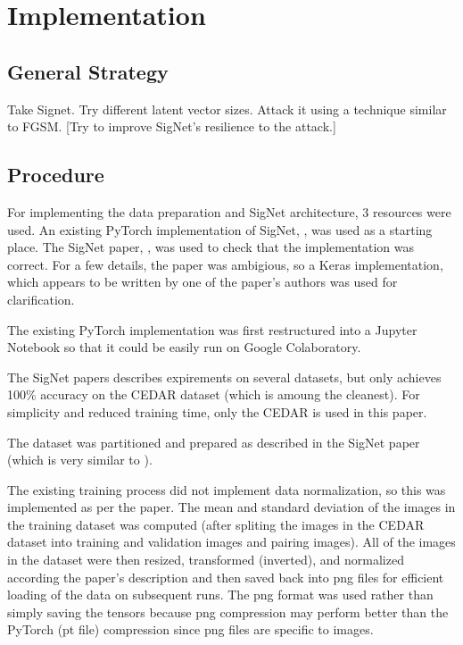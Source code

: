 \section{Implementation}\label{sec:implementation}


\subsection{General Strategy}

Take Signet.
Try different latent vector sizes.
Attack it using a technique similar to FGSM.
[Try to improve SigNet's resilience to the attack.]


\subsection{Procedure}

For implementing the data preparation and SigNet architecture, 3 resources were used.
An existing PyTorch implementation of SigNet, \cite{GitHub_signet_pytorch}, was used as a starting place.
The SigNet paper, \cite{sig_net}, was used to check that the implementation was correct.
For a few details, the paper was ambigious, so a Keras implementation, \cite{GitHub_sounakdey} which appears to be written by one of the paper's authors was used for clarification.

The existing PyTorch implementation was first restructured into a Jupyter Notebook so that it could be easily run on Google Colaboratory.

The SigNet papers describes expirements on several datasets, but only achieves 100\% accuracy on the CEDAR dataset (which is amoung the cleanest).
For simplicity and reduced training time, only the CEDAR is used in this paper.

The dataset was partitioned and prepared as described in the SigNet paper (which is very similar to \cite{LeCun}).

The existing training process did not implement data normalization, so this was implemented as per the paper.
The mean and standard deviation of the images in the training dataset was computed (after spliting the images in the CEDAR dataset into training and validation images and pairing images).
All of the images in the dataset were then resized, transformed (inverted), and normalized according the paper's description and then saved back into png files for efficient loading of the data on subsequent runs.
The png format was used rather than simply saving the tensors because png compression may perform better than the PyTorch (pt file) compression since png files are specific to images.

